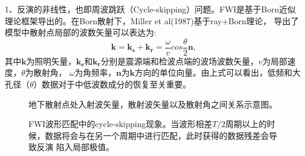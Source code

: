 1、反演的非线性，也即周波跳跃（Cycle-skipping）问题。FWI是基于Born近似理论框架导出的。在Born散射下，Miller et
al(1987)\cite{MillerEtAl1987}基于ray+Born理论，
导出了模型中散射点局部的波数矢量可以表达为:
\begin{equation}
    \mathbf{k}=\mathbf{k_s}+\mathbf{k_r}=\frac{\omega}{v}cos\frac{\theta}{2}\mathbf{n},
    \label{eq:Modelwnb}
\end{equation}
其中$\mathbf{k}$为照明矢量，$\mathbf{k_s}$和$\mathbf{k_r}$分别是震源端和检波点端的波场波数矢量，$v$为局部速度，$\theta$为散射角，
$\omega$为角频率，$\mathbf{n}$为$\mathbf{k}$方向的单位向量。由上式可以看出，低频和大孔径（$\theta$）数据对于中低波数成分的恢复至关重要。
\begin{figure}[!htb] 
   \centering 
   \caption{地下散射点处入射波矢量，散射波矢量以及散射角之间关系示意图。}
   \label{fig:WavenumberVector}
\end{figure}
\begin{figure}[!htb] 
   \centering 
   \caption{FWI波形匹配中的cycle-skipping现象。当波形相差$T/2$周期以上的时候，数据将会与在另一个周期中进行匹配，此时获得的数据残差会导致反演
   陷入局部极值。}
   \label{fig:Cycleskipping}
\end{figure}
